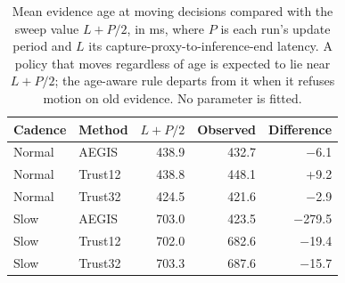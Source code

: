 \begin{table}[H]\centering\small
\caption{Mean evidence age at moving decisions compared with the sweep value $L+P/2$, in ms, where $P$ is each run's update period and $L$ its capture-proxy-to-inference-end latency. A policy that moves regardless of age is expected to lie near $L+P/2$; the age-aware rule departs from it when it refuses motion on old evidence. No parameter is fitted.}\label{tab:age-sweep}
\begin{tabular}{@{}llrrr@{}}
\toprule Cadence & Method & $L+P/2$ & Observed & Difference\\ \midrule
Normal & AEGIS & 438.9 & 432.7 & $-$6.1\\
Normal & Trust12 & 438.8 & 448.1 & +9.2\\
Normal & Trust32 & 424.5 & 421.6 & $-$2.9\\
Slow & AEGIS & 703.0 & 423.5 & $-$279.5\\
Slow & Trust12 & 702.0 & 682.6 & $-$19.4\\
Slow & Trust32 & 703.3 & 687.6 & $-$15.7\\
\bottomrule
\end{tabular}
\end{table}
